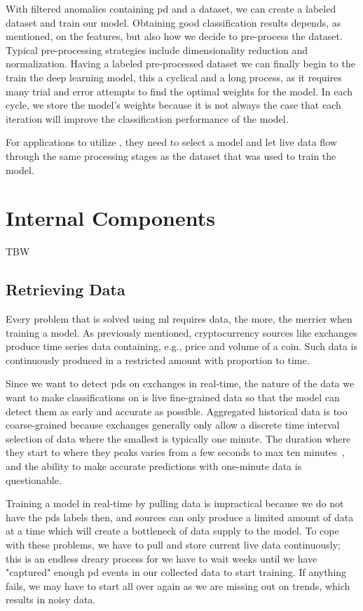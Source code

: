 With filtered anomalies containing \ac{pd} and a dataset, we can create a labeled dataset and train our model. Obtaining good classification results depends, as mentioned, on the features, but also how we decide to pre-process the dataset. Typical pre-processing strategies include dimensionality reduction and normalization. Having a labeled pre-processed dataset we can finally begin to the train the deep learning model, this a cyclical and a long process, as it requires many trial and error attempts to find the optimal weights for the model. In each cycle, we store the model's weights because it is not always the case that each iteration will improve the classification performance of the model.

For applications to utilize \project, they need to select a model and let live data flow through the same processing stages as the dataset that was used to train the model.

\section{Internal Components}
TBW

\subsection{Retrieving Data}
Every problem that is solved using \ac{ml} requires data, the more, the merrier when training a model. As previously mentioned, cryptocurrency sources like exchanges produce time series data containing, e.g., price and volume of a coin. Such data is continuously produced in a restricted amount with proportion to time.

Since we want to detect \acp{pd} on exchanges in real-time, the nature of the data we want to make classifications on is  live fine-grained data so that the model can detect them as early and accurate as possible. Aggregated historical data is too coarse-grained because exchanges generally only allow a discrete time interval selection of data where the smallest is typically one minute. The duration where they start to where they peaks varies from a few seconds to max ten minutes~\cite{P&D_MIT_crypto, P&D_to_the_moon}, and the ability to make accurate predictions with one-minute data is questionable.

Training a model in real-time by pulling data is impractical because we do not have the \acp{pd} labels then, and sources can only produce a limited amount of data at a time which will create a bottleneck of data supply to the model. To cope with these problems, we have to pull and store current live data continuously; this is an endless dreary process for we have to wait weeks until we have "captured" enough \ac{pd} events in our collected data to start training. If anything fails, we may have to start all over again as we are missing out on trends, which results in noisy data.

